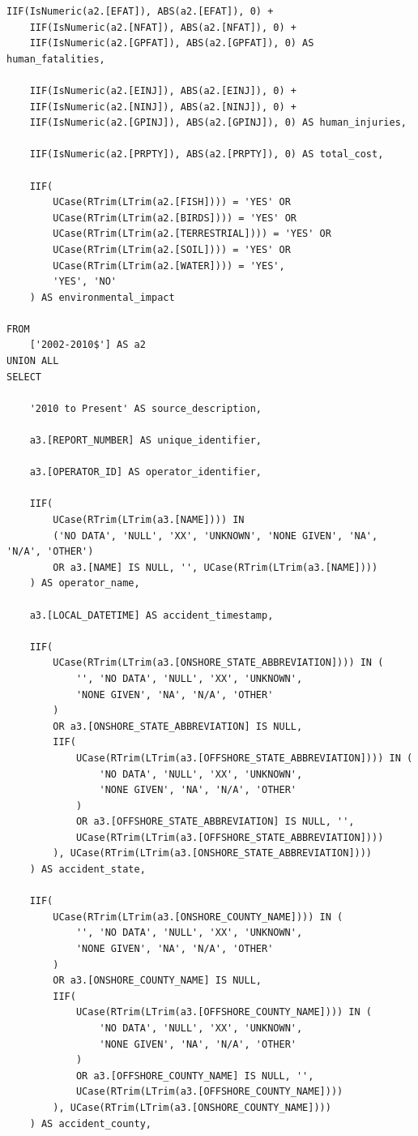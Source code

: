 \documentclass[letterpaper,10pt,oneside,final,onecolumn]{article}
\begin{document}
\begin{lstlisting}[label=accident-query,caption={\textit{JetSQL} statement to collate pipeline accidents into a single data set}]
	IIF(IsNumeric(a2.[EFAT]), ABS(a2.[EFAT]), 0) +
	IIF(IsNumeric(a2.[NFAT]), ABS(a2.[NFAT]), 0) +
	IIF(IsNumeric(a2.[GPFAT]), ABS(a2.[GPFAT]), 0) AS human_fatalities,

	IIF(IsNumeric(a2.[EINJ]), ABS(a2.[EINJ]), 0) +
	IIF(IsNumeric(a2.[NINJ]), ABS(a2.[NINJ]), 0) +
	IIF(IsNumeric(a2.[GPINJ]), ABS(a2.[GPINJ]), 0) AS human_injuries,

	IIF(IsNumeric(a2.[PRPTY]), ABS(a2.[PRPTY]), 0) AS total_cost,

	IIF(
		UCase(RTrim(LTrim(a2.[FISH]))) = 'YES' OR
		UCase(RTrim(LTrim(a2.[BIRDS]))) = 'YES' OR
		UCase(RTrim(LTrim(a2.[TERRESTRIAL]))) = 'YES' OR
		UCase(RTrim(LTrim(a2.[SOIL]))) = 'YES' OR 
		UCase(RTrim(LTrim(a2.[WATER]))) = 'YES',
		'YES', 'NO'
	) AS environmental_impact

FROM
	['2002-2010$'] AS a2
UNION ALL
SELECT

	'2010 to Present' AS source_description,

	a3.[REPORT_NUMBER] AS unique_identifier,

	a3.[OPERATOR_ID] AS operator_identifier,

	IIF(
		UCase(RTrim(LTrim(a3.[NAME]))) IN 
		('NO DATA', 'NULL', 'XX', 'UNKNOWN', 'NONE GIVEN', 'NA', 'N/A', 'OTHER') 
		OR a3.[NAME] IS NULL, '', UCase(RTrim(LTrim(a3.[NAME])))
	) AS operator_name,

	a3.[LOCAL_DATETIME] AS accident_timestamp,

	IIF(
		UCase(RTrim(LTrim(a3.[ONSHORE_STATE_ABBREVIATION]))) IN (
			'', 'NO DATA', 'NULL', 'XX', 'UNKNOWN',
			'NONE GIVEN', 'NA', 'N/A', 'OTHER'
		)
		OR a3.[ONSHORE_STATE_ABBREVIATION] IS NULL, 
		IIF(
			UCase(RTrim(LTrim(a3.[OFFSHORE_STATE_ABBREVIATION]))) IN (
				'NO DATA', 'NULL', 'XX', 'UNKNOWN',
				'NONE GIVEN', 'NA', 'N/A', 'OTHER'
			)
			OR a3.[OFFSHORE_STATE_ABBREVIATION] IS NULL, '',
			UCase(RTrim(LTrim(a3.[OFFSHORE_STATE_ABBREVIATION])))
		), UCase(RTrim(LTrim(a3.[ONSHORE_STATE_ABBREVIATION])))
	) AS accident_state,

	IIF(
		UCase(RTrim(LTrim(a3.[ONSHORE_COUNTY_NAME]))) IN (
			'', 'NO DATA', 'NULL', 'XX', 'UNKNOWN',
			'NONE GIVEN', 'NA', 'N/A', 'OTHER'
		)
		OR a3.[ONSHORE_COUNTY_NAME] IS NULL, 
		IIF(
			UCase(RTrim(LTrim(a3.[OFFSHORE_COUNTY_NAME]))) IN (
				'NO DATA', 'NULL', 'XX', 'UNKNOWN',
				'NONE GIVEN', 'NA', 'N/A', 'OTHER'
			)
			OR a3.[OFFSHORE_COUNTY_NAME] IS NULL, '',
			UCase(RTrim(LTrim(a3.[OFFSHORE_COUNTY_NAME])))
		), UCase(RTrim(LTrim(a3.[ONSHORE_COUNTY_NAME])))
	) AS accident_county,


\end{lstlisting}
\end{document}
